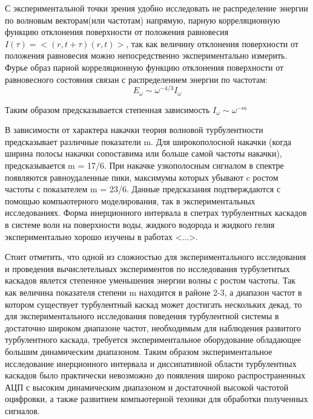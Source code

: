 С экспериментальной точки зрения удобно исследовать не распределение энергии по волновым векторам(или частотам) напрямую, парную корреляционную функцию отклонения поверхности от положения равновесия $I(\tau)=<(r, t+\tau)(r,t)>$, так как величину отклонения поверхности от положения равновесия можно непосредственно экспериментально измерить. Фурье образ парной корреляционную функцию отклонения поверхности от равновесного состояния связан с распределением энергии по частотам:
\begin{equation}
\label{eq:EOmegaI}
E_\omega \sim \omega^{-4/3}I_\omega
\end{equation}

Таким образом предсказывается степенная зависимость $I_\omega \sim \omega^{-m}$

В зависимости от характера накачки теория волновой турбулентности предсказывает различные показатели m. Для широкополосной накачки (когда ширина полосы накачки сопоставима или больше самой частоты накачки), предсказывается m = 17/6. При накачке узкополосным сигналом в спектре появляются равноудаленные пики, максимумы которых убывают c ростом частоты с показателем m = 23/6. Данные предсказания подтверждаются с помощью компьютерного моделирования, так в экспериментальных исследованиях. Форма инерционного интервала в спетрах турбулентных каскадов в системе волн на поверхности воды, жидкого водорода и жидкого гелия экспериментально хорошо изучены в работах <...>. 

Стоит отметить, что одной из сложностью для экспериментального исследования и проведения вычислетельных экспериментов по исследования турбулетнтых каскадов явлется степенное уменьшения энергии волны с ростом частоты. Так как величина показателя степени m находится в районе 2-3, а диапазон частот в котором существует турбулентный каскад может достигать нескольких декад, то для экспериментального исследования поведения турбулентной системы в достаточно широком диапазоне частот, необходимым для наблюдения развитого турбулентного каскада, требуется экспериментальное оборудование обладающее большим динамическим диапазоном. Таким образом экспериментальное исследование инерционного интервала и диссипативной области турбулентных каскадов было практически невозможно до появления широко распространенных АЦП с высоким динамическим диапазоном и достаточной высокой частотой оцифровки, а также развитием компьютерной техники для обработки полученных сигналов.

